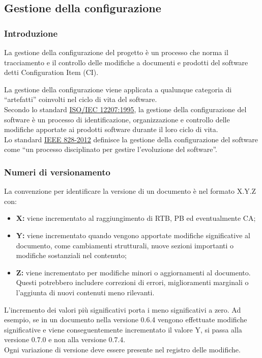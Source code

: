 \subsection{Gestione della configurazione}
\subsubsection{Introduzione}
La gestione della configurazione del progetto è un processo che norma il tracciamento e il controllo delle modifiche a documenti e prodotti del software detti Configuration Item (CI).

La gestione della configurazione viene applicata a qualunque categoria di “artefatti” coinvolti nel ciclo di vita del software. \\
Secondo lo standard \href{https://www.math.unipd.it/~tullio/IS-1/2009/Approfondimenti/ISO_12207-1995.pdf}{ISO/IEC 12207:1995}, la gestione della configurazione del software è un processo di identificazione, organizzazione e controllo delle modifiche apportate ai prodotti software durante il loro ciclo di vita. \\
Lo standard \href{https://standards.ieee.org/ieee/828/5367/}{IEEE 828-2012} definisce la gestione della configurazione del software come “un processo disciplinato per gestire l’evoluzione del software”.

\subsubsection{Numeri di versionamento}\label{subsubsec:versionamento}
La convenzione per identificare la versione di un documento è nel formato X.Y.Z con:
\begin{itemize}
    \item \textbf{X:} viene incrementato al raggiungimento di RTB, PB ed eventualmente CA;
    \item \textbf{Y:} viene incrementato quando vengono apportate modifiche significative al documento, come cambiamenti strutturali, nuove sezioni importanti o modifiche sostanziali nel contenuto;
    \item \textbf{Z:} viene incrementato per modifiche minori o aggiornamenti al documento. Questi potrebbero includere correzioni di errori, miglioramenti marginali o l'aggiunta di nuovi contenuti meno rilevanti.
\end{itemize}

L'incremento dei valori più significativi porta i meno significativi a zero. Ad esempio, se in un documento nella versione 0.6.4 vengono effettuate modifiche significative e viene conseguentemente incrementato il valore Y, si passa alla versione 0.7.0 e non alla versione 0.7.4. \\
Ogni variazione di versione deve essere presente nel registro delle modifiche.

